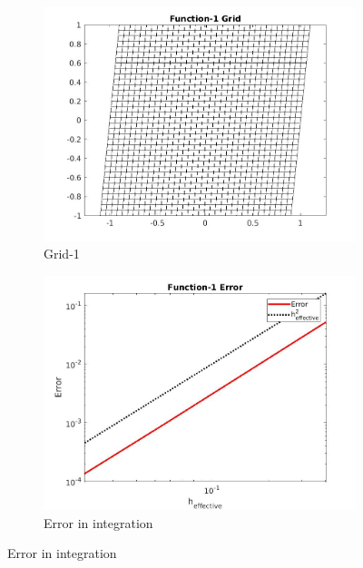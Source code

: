 \documentclass{article}
\begin{document}
\begin{figure}
    \begin{subfigure}{\textwidth}
    \centering
    \includegraphics[scale=0.33]{grid_1.jpeg}
    \caption{Grid-1}
    \label{fig:doc1}
    \end{subfigure}

    \bigskip
    \begin{subfigure}{\textwidth}
    \centering
    \includegraphics[scale=0.33]{error-in-1.jpg}
    \caption{Error in integration}
    \label{fig:doc2}
    \end{subfigure}


\end{figure}
\end{document}

